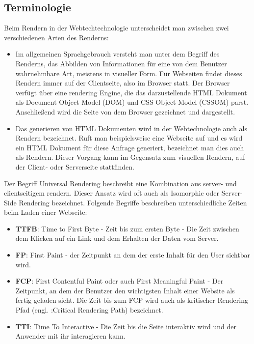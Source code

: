 \documentclass[runningheads]{llncs}
\numberwithin{figure}{section}
\begin{document}
\subsection{Terminologie}
\label{subsec:Terminologie}
Beim Rendern in der Webtechtechnologie unterscheidet man zwischen 
zwei verschiedenen Arten des Renderns:
\begin{itemize}
  \setlength\itemsep{1em}
  \item Im allgemeinen Sprachgebrauch versteht man unter dem
  Begriff des Renderns, das Abbilden von Informationen für eine von dem Benutzer
  wahrnehmbare Art, meistens in visueller Form. Für Webseiten findet dieses Rendern 
  immer auf der Clientseite, also im Browser statt. Der Browser verfügt über eine rendering Engine,
  die das darzustellende HTML Dokument als Document Object Model (DOM) und CSS Object Model (CSSOM) parst.
  Anschließend wird die Seite von dem Browser gezeichnet und dargestellt.\cite{chen_geroimenko_2006}
  \item Das generieren von HTML Dokumenten wird in der Webtechnologie auch als Rendern 
  bezeichnet. Ruft man beispielsweise eine Webseite auf und es wird ein HTML Dokument für diese 
  Anfrage generiert, bezeichnet man dies auch als Rendern. Dieser Vorgang kann im Gegensatz zum visuellen Rendern,
  auf der Client- oder Serverseite stattfinden.
\end{itemize}
Der Begriff Universal Rendering beschreibt eine Kombination aus server- und clientseitigem rendern. 
Dieser Ansatz wird oft auch als Isomorphic oder Server-Side Rendering bezeichnet.
Folgende Begriffe beschreiben unterschiedliche Zeiten beim Laden einer Webseite:
\begin{itemize}
  \setlength\itemsep{1em}
  \item \textbf{TTFB}: Time to First Byte - Zeit bis zum ersten Byte -  Die Zeit zwischen dem Klicken auf ein Link und dem Erhalten der Daten vom Server.
  \item \textbf{FP}: First Paint - der Zeitpunkt an dem der erste Inhalt für den User sichtbar wird.
  \item \textbf{FCP}: First Contentful Paint oder auch First Meaningful Paint - Der Zeitpunkt, an dem der Benutzer den wichtigsten Inhalt einer Website als fertig geladen sieht. Die Zeit bis zum FCP wird auch als kritischer Rendering-Pfad (engl. :Critical Rendering Path) bezeichnet.
  \item \textbf{TTI}: Time To Interactive - Die Zeit bis die Seite interaktiv wird und der Anwender mit ihr interagieren kann.
\end{itemize}
\end{document}

